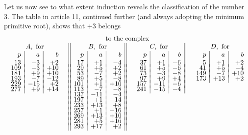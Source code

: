 \documentclass[twoside,12pt]{memoir}
\begin{document}
Let us now see to what extent induction reveals the classification of the number 3. The table in article 11, continued  further (and always adopting the minimum primitive root), shows that \(+3\) belongs
\[\begin{array}{cccc}
\multicolumn{4}{c}{\text{to the complex}}\\
\begin{array}[t]{r|r|r} 
\multicolumn{3}{c}{ A, \text{ for} }\\
p & a & b \\
13 & -3 & +2 \\[-4pt]
109 & -3 & +10 \\[-4pt]
181 & +9 & +10 \\[-4pt]
193 & -7 & -12 \\[-4pt]
229 & -15 & +2 \\[-4pt]
277 & +9 & +14 
\end{array} & 
\begin{array}[t]{||r|r|r||} 
\multicolumn{3}{||c||}{ B, \text{ for} }\\
p & a & b \\
17&+1&-4\\[-4pt]
29&+5&+2\\[-4pt]
53&-7&+2\\[-4pt]
89&+5&-8\\[-4pt]
101&+1&+10\\[-4pt]
113&-7&-8\\[-4pt]
137&-11&-4\\[-4pt]
197&+1&-14\\[-4pt]
233&+13&+8\\[-4pt]
257&+1&-16\\[-4pt]
269&+13&+10\\[-4pt]
281&+5&+16\\[-4pt]
293&+17&+2
\end{array}&
\begin{array}[t]{r|r|r||}
\multicolumn{3}{c||}{ C, \text{ for} }\\
p & a & b \\
37&+1&-6\\[-4pt]
61&+5&-6\\[-4pt]
73&-3&-8\\[-4pt]
97&+9&+4\\[-4pt]
157&-11&-6\\[-4pt] 
241&-15&-4 
\end{array}
&
\begin{array}[t]{r|r|r} 
\multicolumn{3}{c}{ D, \text{ for} }\\
p & a & b \\
5&+1&+2\\[-4pt]
41&+5&-4\\[-4pt]
149&-7&+10\\[-4pt]
173&+13&+2
\end{array}
\end{array}\]
%
\end{document}

